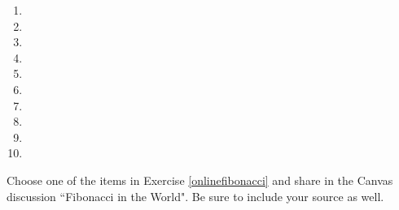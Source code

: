 \begin{multicols}{2}
\begin{enumerate}
    \item \hspace{.5in}
    \vspace{.25in}
    \item \hspace{.5in}
    \vspace{.25in}
    \item \hspace{.5in}
    \vspace{.25in}
    \item \hspace{.5in}
    \vspace{.25in}
    \item \hspace{.5in}
    \vspace{.25in}
    \item \hspace{.5in}
    \vspace{.25in}
    \item \hspace{.5in}
    \vspace{.25in}
    \item \hspace{.5in}
    \vspace{.25in}
    \item \hspace{.5in}
    \vspace{.25in}
    \item \hspace{.5in}
\end{enumerate}	
\end{multicols}

\begin{exercise}
Choose one of the items in Exercise \ref{onlinefibonacci} and share in the Canvas discussion ``Fibonacci in the World". Be sure to include your source as well.
\end{exercise}






